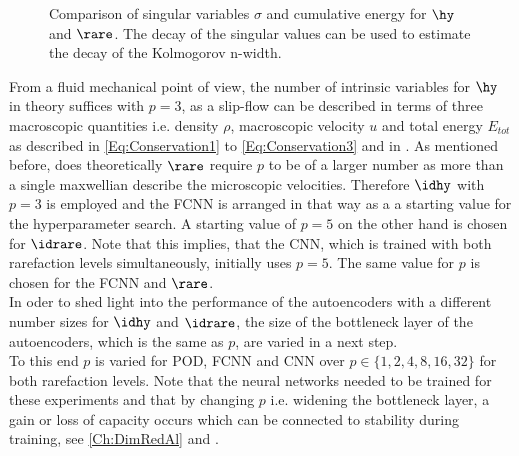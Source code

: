 \begin{figure}[H]
	\begin{subfigure}{.45\textwidth}
		
		\label{Fig:CumSum_Rare}
	\end{subfigure}\hfill
	\begin{subfigure}{.45\textwidth}
		
		\label{Fig:CumSum_Hydro}
	\end{subfigure}
	\caption{Comparison of singular variables \(\sigma\) and cumulative energy for \(\hy\) and \(\rare\). The decay of the singular values can be used to estimate the decay of the Kolmogorov n-width.}
	\label{Fig:CUSUM-e}
\end{figure}
From a fluid mechanical point of view, the number of intrinsic variables for \(\hy\) in theory suffices with \(p=3\), as a slip-flow can be described in terms of three macroscopic quantities i.e. density \(\rho\), macroscopic velocity \(u\) and total energy \(E_{tot}\)as described in \cref{Eq:Conservation1} to \cref{Eq:Conservation3} and in \cite{BGK}\cite{Bernard}. As mentioned before, does theoretically \(\rare\) require \(p\) to be of a larger number as more than a single maxwellian describe the microscopic velocities. Therefore \(\idhy\) with \(p=3\) is employed and the FCNN is arranged in that way as a a starting value for the hyperparameter search. A starting value of \(p=5\) on the other hand is chosen for \(\idrare\). Note that this implies, that the CNN, which is trained with both rarefaction levels simultaneously, initially uses \(p=5\). The same value for \(p\) is chosen for the FCNN and \(\rare\).\\
In oder to shed light into the performance of the autoencoders with a different number sizes for \(\idhy\) and \(\idrare\), the size of the bottleneck layer of the autoencoders, which is the same as \(p\), are varied in a next step.\\
To this end $p$ is varied for POD, FCNN and CNN over $p \in \{1,2,4,8,16,32\}$ for both rarefaction levels. Note that the neural networks needed to be trained for these experiments and that by changing $p$ i.e. widening the bottleneck layer, a gain or loss of capacity occurs which can be connected to stability during training, see \cref{Ch:DimRedAl} and \cite{Goodfellow}.
